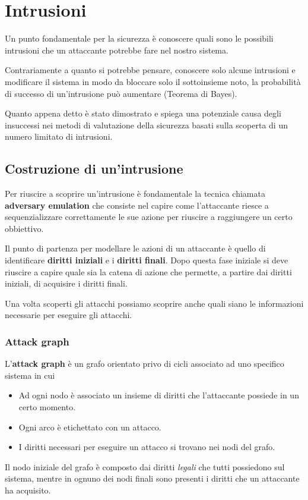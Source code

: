 \chapter{Intrusioni}
Un punto fondamentale per la sicurezza è conoscere quali sono le possibili intrusioni che un attaccante potrebbe fare
nel nostro sistema.

Contrariamente a quanto si potrebbe pensare, conoscere solo alcune intrusioni e modificare il sistema in modo da
bloccare solo il sottoinsieme noto, la probabilità di successo di un'intrusione può aumentare (Teorema di Bayes).

Quanto appena detto è stato dimostrato e spiega una potenziale causa degli insuccessi nei metodi di valutazione della
sicurezza basati sulla scoperta di un numero limitato di intrusioni.

\section{Costruzione di un'intrusione}
Per riuscire a scoprire un'intrusione è fondamentale la tecnica chiamata \textbf{adversary emulation} che consiste nel
capire come l'attaccante riesce a sequenzializzare correttamente le sue azione per riuscire a raggiungere un certo
obbiettivo.

Il punto di partenza per modellare le azioni di un attaccante è quello di identificare \textbf{diritti iniziali} e i
\textbf{diritti finali}. Dopo questa fase iniziale si deve riuscire a capire quale sia la catena di azione che
permette, a partire dai diritti iniziali, di acquisire i diritti finali.

Una volta scoperti gli attacchi possiamo scoprire anche quali siano le informazioni necessarie per eseguire gli
attacchi.

\subsection{Attack graph}
L'\textbf{attack graph} è un grafo orientato privo di cicli associato ad uno specifico sistema in cui
\begin{itemize}
	\item Ad ogni nodo è associato un insieme di diritti che l'attaccante possiede in un certo momento.
	\item Ogni arco è etichettato con un attacco.
	\item I diritti necessari per eseguire un attacco si trovano nei nodi del grafo.
\end{itemize}
Il nodo iniziale del grafo è composto dai diritti \emph{legali} che tutti possiedono sul sistema, mentre in ognuno dei
nodi finali sono presenti i diritti che un attaccante ha acquisito.

